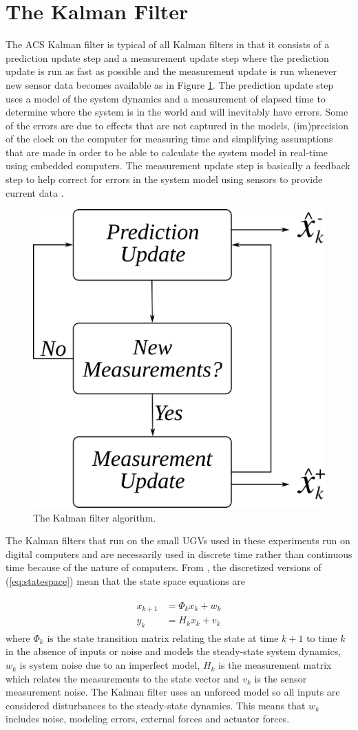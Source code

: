 \section{The Kalman Filter}
\label{sec:kalmanfilter}
The ACS Kalman filter is typical of all Kalman filters in that it consists of a prediction update step and a measurement update step where the prediction update is run as fast as possible and the measurement update is run whenever new sensor data becomes available as in Figure \ref{fig:kf}. The prediction update step uses a model of the system dynamics and a measurement of elapsed time to determine where the system is in the world and will inevitably have errors. Some of the errors are due to effects that are not captured in the models, (im)precision of the clock on the computer for measuring time and simplifying assumptions that are made in order to be able to calculate the system model in real-time using embedded computers. The measurement update step is basically a feedback step to help correct for errors in the system model using sensors to provide current data \cite{Kelly_1994_338}.

\begin{figure}[ht!]
	\centering
	\includegraphics[width=.4\textwidth]{images/kf}
	\caption{The Kalman filter algorithm.}
	\label{fig:kf}
\end{figure}

The Kalman filters that run on the small UGVs used in these experiments run on digital computers and are necessarily used in discrete time rather than continuous time because of the nature of computers. From \cite{Kelly_1994_338}, \cite{Simon06OptimalEstimation} the discretized versions of (\ref{eq:statespace}) mean that the state space equations are

\begin{align}
\label{eq:kfstatemodel}
\begin{split}
x_{k+1} &= \Phi_kx_k + w_k \\
y_k &= H_kx_k + v_k
\end{split}
\end{align}
where $\Phi_k$ is the state transition matrix relating the state at time $k+1$ to time $k$ in the absence of inputs or noise and models the steady-state system dynamics, $w_k$ is system noise due to an imperfect model, $H_k$ is the measurement matrix which relates the measurements to the state vector and $v_k$ is the sensor measurement noise. The Kalman filter uses an unforced model so all inputs are considered disturbances to the steady-state dynamics. This means that $w_k$ includes noise, modeling errors, external forces and actuator forces.

